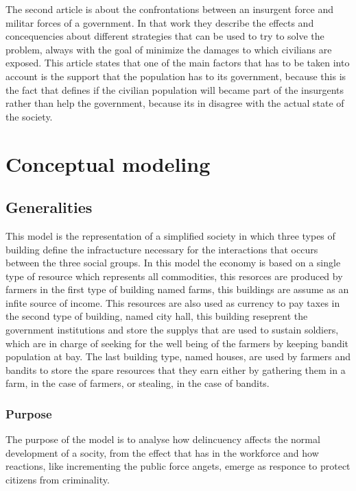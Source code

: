 \documentclass{wscpaperproc}
\theoremstyle{wsc}
\begin{document}
The second article is about the confrontations between an insurgent force and    
militar forces of a government. In that work they describe the effects and       
concequencies about different strategies that can be used to try to solve the    
problem, always with the goal of minimize the damages to which civilians are     
exposed. This article states that one of the main factors that has to be taken   
into account is the support that the population has to its government, because   
this is the fact that defines if the civilian population will became part of the 
insurgents rather than help the government, because its in disagree with the     
actual state of the society. \cite{article2}

\section{Conceptual modeling}

\subsection{Generalities}

This model is the representation of a simplified society in which three types
of building define the infractucture necessary for the interactions that occurs
between the three social groups. In this model the
economy is based on a single type of resource which represents all commodities,
this resorces are produced by farmers in the first type of building named
farms, this buildings are assume as an infite source of income. This
resources are also used as currency to pay taxes in the second type of
building, named city hall, this building reseprent the government
institutions and store the supplys that are used to sustain soldiers,
which are in charge of seeking for the well being of the farmers by
keeping bandit population at bay. The last building type, named houses,
are used by farmers and bandits to store the spare resources that they
earn either by gathering them in a farm, in the case of farmers, or
stealing, in the case of bandits.

\subsubsection{Purpose}

The purpose of the model is to analyse how delincuency affects the normal
development of a socity, from the effect that has in the workforce and how
reactions, like incrementing the public force angets, emerge as responce to
protect citizens from criminality.
\end{document}
